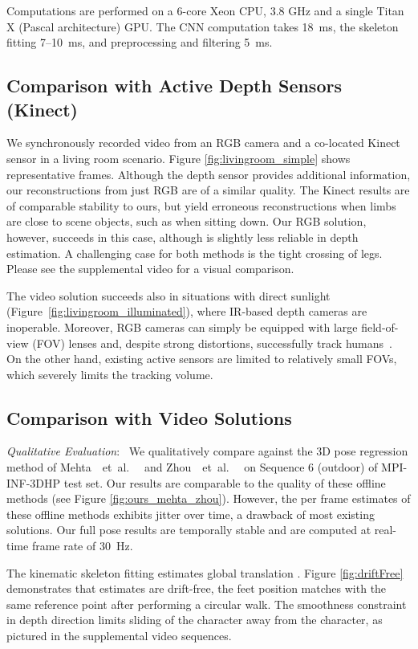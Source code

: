 \documentclass[acmtog]{acmart}
\newcommand{\parahead}[1]{\vspace{5pt}\noindent\emph{#1}:\ }
\newcommand{\etal}{~et~al.\ }
\newcommand{\change}[1]{{#1}}
\newcommand{\FPS}{30}
\begin{document}
\change{Computations are performed on a 6-core Xeon CPU, 3.8 GHz and a single Titan X (Pascal architecture) GPU}.
The CNN computation takes 18~ms, the skeleton fitting 7--10~ms, and preprocessing and filtering 5~ms.

\subsection{Comparison with Active Depth Sensors (Kinect)}
We synchronously recorded video from an RGB camera and a co-located Kinect sensor in a living room scenario.
Figure \ref{fig:livingroom_simple} shows representative frames.
Although the depth sensor provides additional information, our reconstructions from just RGB are of a similar quality.
The Kinect results are of comparable stability to ours, but yield erroneous reconstructions when limbs are close to scene objects, such as when sitting down.
Our RGB solution, however, succeeds in this case, although is slightly less reliable in depth estimation.
A challenging case for both methods is the tight crossing of legs.
\change{Please see the supplemental video for a visual comparison.}


The video solution succeeds also in situations with direct sunlight (Figure~\ref{fig:livingroom_illuminated}), where IR-based depth cameras are inoperable.
Moreover, RGB cameras can simply be equipped with large field-of-view (FOV) lenses and, despite strong distortions, successfully track humans~\cite{rhodin_egocap_SIGGRAPHAsia2016}.
On the other hand, existing active sensors are limited to relatively small FOVs, which severely limits the tracking volume.




\subsection{Comparison with Video Solutions}
\parahead{Qualitative Evaluation}
We qualitatively compare against the 3D pose regression method of Mehta~\etal~ and Zhou~\etal~
on Sequence 6 (outdoor) of MPI-INF-3DHP test set. 
Our results are comparable to the quality of these offline methods (see Figure \ref{fig:ours_mehta_zhou}).
However, the per frame estimates of these offline methods exhibits jitter over time, a drawback of most existing solutions.
Our full pose results are temporally stable and are computed at real-time frame rate of \FPS~Hz.


The kinematic skeleton fitting estimates global translation .
Figure \ref{fig:driftFree} demonstrates that estimates are drift-free, the feet position matches with the same reference point after performing a circular walk.
The smoothness constraint in depth direction limits sliding of the character away from the character, as pictured in the supplemental video sequences.
\end{document}
